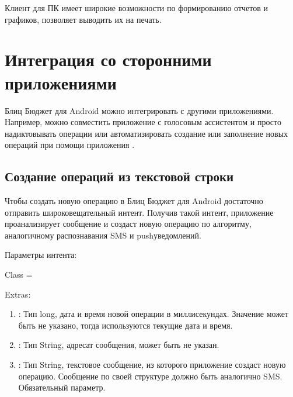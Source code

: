 \documentclass[a4paper,10pt,russian]{sphinxmanual}
\begin{document}
\sphinxAtStartPar
Клиент для ПК имеет широкие возможности по формированию отчетов и графиков, позволяет выводить их на печать.

\sphinxstepscope


\chapter{Интеграция со сторонними приложениями}
\label{\detokenize{api:chapter-api}}\label{\detokenize{api:id1}}\label{\detokenize{api::doc}}
\sphinxAtStartPar
Блиц Бюджет для Android можно интегрировать с другими приложениями. Например, можно совместить приложение с голосовым
ассистентом и просто надиктовывать операции или автоматизировать создание или заполнение новых операций при помощи
приложения .


\section{Создание операций из текстовой строки}
\label{\detokenize{api:id2}}
\sphinxAtStartPar
Чтобы создать новую операцию в Блиц Бюджет для Android достаточно отправить широковещательный интент. Получив такой
интент, приложение проанализирует сообщение и создаст новую операцию по алгоритму, аналогичному распознавания SMS
и push\sphinxhyphen{}уведомлений.

\sphinxAtStartPar
Параметры интента:

\sphinxAtStartPar
Class = 

\sphinxAtStartPar
Extras:
\begin{enumerate}
%
\item {} 
\sphinxAtStartPar
{}: Тип long, дата и время новой операции в миллисекундах. Значение может быть не указано, тогда используются текущие дата и время.

\item {} 
\sphinxAtStartPar
{}: Тип String, адресат сообщения, может быть не указан.

\item {} 
\sphinxAtStartPar
{}: Тип String, текстовое сообщение, из которого приложение создаст новую операцию. Сообщение по своей структуре должно быть аналогично SMS. Обязательный параметр.

\end{enumerate}
\end{document}
